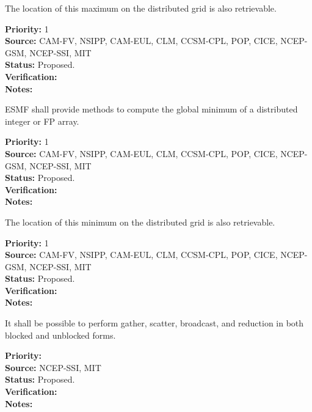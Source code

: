 
The location of this maximum on the distributed grid is also
retrievable.

\begin{reqlist}
{\bf Priority:} 1\\ 
{\bf Source:} CAM-FV, NSIPP, CAM-EUL, CLM, CCSM-CPL, POP, CICE, NCEP-GSM, NCEP-SSI, MIT \\
{\bf Status:} Proposed. \\
{\bf Verification:} \\
{\bf Notes:}
\end{reqlist}



ESMF shall provide methods to compute the global minimum of a
distributed integer or FP array.

\begin{reqlist}
{\bf Priority:} 1\\ 
{\bf Source:} CAM-FV, NSIPP, CAM-EUL, CLM, CCSM-CPL, POP, CICE, NCEP-GSM, NCEP-SSI, MIT \\
{\bf Status:} Proposed. \\
{\bf Verification:} \\
{\bf Notes:}
\end{reqlist}



The location of this minimum on the distributed grid is also
retrievable.

\begin{reqlist}
{\bf Priority:} 1 \\ 
{\bf Source:} CAM-FV, NSIPP, CAM-EUL, CLM, CCSM-CPL, POP, CICE, NCEP-GSM, NCEP-SSI, MIT \\
{\bf Status:} Proposed. \\
{\bf Verification:} \\
{\bf Notes:}
\end{reqlist}


It shall be possible to perform gather, scatter, broadcast, and reduction in both blocked and unblocked forms.

\begin{reqlist}
{\bf Priority:} \\ 
{\bf Source:} NCEP-SSI, MIT \\
{\bf Status:} Proposed. \\
{\bf Verification:} \\
{\bf Notes:} 
\end{reqlist}

